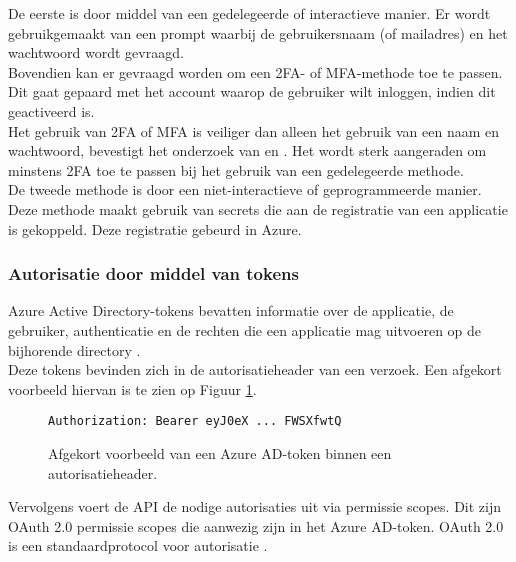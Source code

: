 De eerste is door middel van een gedelegeerde of interactieve manier. Er wordt gebruikgemaakt van een prompt waarbij de gebruikersnaam (of mailadres) en het wachtwoord wordt gevraagd. \\

Bovendien kan er gevraagd worden om een \ac{2FA}- of \ac{MFA}-methode toe te passen. Dit gaat gepaard met het account waarop de gebruiker wilt inloggen, indien dit geactiveerd is. \\

Het gebruik van \ac{2FA} of \ac{MFA} is veiliger dan alleen het gebruik van een naam en wachtwoord, bevestigt het onderzoek van \textcite{Gunson2011} en \textcite{Banyal2013}. Het wordt sterk aangeraden om minstens \ac{2FA} toe te passen bij het gebruik van een gedelegeerde methode. \\

De tweede methode is door een niet-interactieve of geprogrammeerde manier. Deze methode maakt gebruik van secrets die aan de registratie van een applicatie is gekoppeld. Deze registratie gebeurd in Azure. 



\subsubsection{Autorisatie door middel van tokens}

Azure Active Directory-tokens bevatten informatie over de applicatie, de gebruiker, authenticatie en de rechten die een applicatie mag uitvoeren op de bijhorende directory \autocite{Microsoft2015}. \\

Deze tokens bevinden zich in de autorisatieheader van een verzoek.
Een afgekort voorbeeld hiervan is te zien op Figuur \ref{ahtoken}. \\

\begin{figure}[h]
    \begin{verbatim}Authorization: Bearer eyJ0eX ... FWSXfwtQ
    \end{verbatim}    
    \caption[Voorbeeld Azure AD-token]{Afgekort voorbeeld van een Azure \Ac{AD}-token binnen een autorisatieheader.}
    \label{ahtoken}
\end{figure}

Vervolgens voert de \ac{API} de nodige autorisaties uit via permissie scopes. Dit zijn OAuth 2.0 permissie scopes die aanwezig zijn in het Azure \Ac{AD}-token. OAuth 2.0 is een standaardprotocol voor autorisatie \autocite{OAuth}. \\

